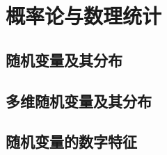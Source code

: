 \part{概率论与数理统计}
\begingroup
\def\x{\chi^2}%
\def\dotsim{\overset{.}{\sim}}%



\chapter{随机变量及其分布}





\chapter{多维随机变量及其分布}








\chapter{随机变量的数字特征}













\endgroup
